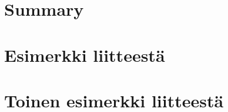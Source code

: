 \documentclass[english, 12pt, a4paper, sci, utf8, a-1b, online]{aaltothesis}
\begin{document}




\section{Summary} 




%
%





\clearpage
\thesisappendix

\section{Esimerkki liitteestä\label{LiiteA}}



\clearpage
\section{Toinen esimerkki liitteestä\label{LiiteB}}


\end{document}
